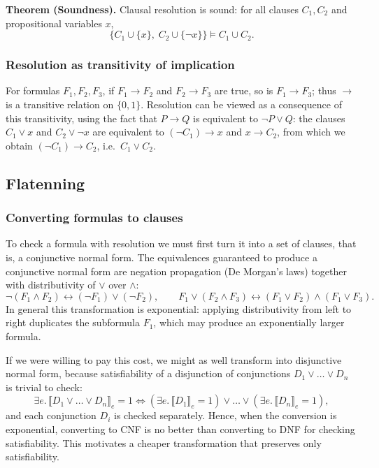 \noindent\textbf{Theorem (Soundness).} Clausal resolution is sound: for all clauses $C_1, C_2$ and propositional variables $x$,
\[
\{C_1 \cup \{x\},\; C_2 \cup \{\neg x\}\} \models C_1 \cup C_2.
\]
 
 
\subsubsection*{Resolution as transitivity of implication}
 
For formulas $F_1, F_2, F_3$, if $F_1 \rightarrow F_2$ and $F_2 \rightarrow F_3$ are true, so is $F_1 \rightarrow F_3$; thus $\rightarrow$ is a transitive relation on $\{0,1\}$. Resolution can be viewed as a consequence of this transitivity, using the fact that $P \rightarrow Q$ is equivalent to $\neg P \vee Q$: the clauses $C_1 \vee x$ and $C_2 \vee \neg x$ are equivalent to $(\neg C_1) \rightarrow x$ and $x \rightarrow C_2$, from which we obtain $(\neg C_1) \rightarrow C_2$, i.e.\ $C_1 \vee C_2$.
 
\subsection{Flatenning}
 
\subsubsection*{Converting formulas to clauses}
 
To check a formula with resolution we must first turn it into a set of clauses, that is, a conjunctive normal form. The equivalences guaranteed to produce a conjunctive normal form are negation propagation (De Morgan's laws) together with distributivity of $\vee$ over $\wedge$:
\[
\neg(F_1 \wedge F_2) \leftrightarrow (\neg F_1) \vee (\neg F_2), \qquad
F_1 \vee (F_2 \wedge F_3) \leftrightarrow (F_1 \vee F_2) \wedge (F_1 \vee F_3).
\]
In general this transformation is exponential: applying distributivity from left to right duplicates the subformula $F_1$, which may produce an exponentially larger formula.
 
If we were willing to pay this cost, we might as well transform into disjunctive normal form, because satisfiability of a disjunction of conjunctions $D_1 \vee \ldots \vee D_n$ is trivial to check:
\[
\exists e.\, \llbracket D_1 \vee \ldots \vee D_n \rrbracket_e = 1 \iff (\exists e.\, \llbracket D_1 \rrbracket_e = 1) \vee \ldots \vee (\exists e.\, \llbracket D_n \rrbracket_e = 1),
\]
and each conjunction $D_i$ is checked separately. Hence, when the conversion is exponential, converting to CNF is no better than converting to DNF for checking satisfiability. This motivates a cheaper transformation that preserves only satisfiability.
 
